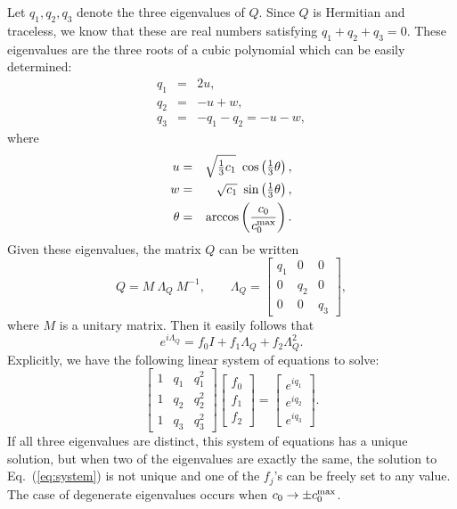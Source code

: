 Let $q_1,q_2,q_3$ denote the three eigenvalues of $Q$. Since $Q$ is
Hermitian and traceless, we know that these are real numbers satisfying
$q_1+q_2+q_3=0$.  These eigenvalues are the three roots of a cubic
polynomial which can be easily determined:
\begin{eqnarray}
q_1 &=& 2u,\\
q_2 &=& -u+w,\\
q_3 &=& -q_1-q_2=-u-w,
\end{eqnarray}
where
\begin{eqnarray}
u &=& \sqrt{\textstyle\frac{1}{3}c_1}
  \ \cos\left(\textstyle\frac{1}{3}\theta\right),\label{eq:udef}\\
w &=& \sqrt{c_1}\ \sin\left(\textstyle\frac{1}{3}\theta\right),\label{eq:wdef}\\
\theta &=& \arccos\left(\frac{c_0}{c_0^{\rm max}}\right).\label{eq:thetadef}
\end{eqnarray}
Given these eigenvalues, the matrix $Q$ can be written
\begin{equation}
 Q = M\ \Lambda_Q\ M^{-1},\qquad 
\Lambda_Q= \left[\begin{array}{ccc} q_1 &0 & 0\\ 0 & q_2 & 0\\
 0 & 0 & q_3\end{array}\right] ,
\end{equation}
where $M$ is a unitary matrix.  Then it easily follows that
\begin{equation}
  e^{i \Lambda_Q}=f_0 I + f_1\Lambda_Q + f_2\Lambda_Q^2.
\end{equation}
Explicitly, we have the following linear system of equations to solve:
\begin{equation}
 \left[\begin{array}{ccc} 1 & q_1 & q_1^2 \\
  1 & q_2 & q_2^2 \\  1 & q_3 & q_3^2 
 \end{array}\right]\left[\begin{array}{c}
  f_0\\f_1\\f_2\end{array}\right]=\left[\begin{array}{c}
 e^{i q_1}\\e^{i q_2}\\e^{i q_3}\end{array}\right].
\label{eq:system}\end{equation}
If all three eigenvalues are distinct, this system of equations
has a unique solution, but when two of the eigenvalues are exactly the
same, the solution to Eq.~(\ref{eq:system}) is not unique and one of the
$f_j$'s can be freely set to any value. The case of degenerate eigenvalues
occurs when $c_0\rightarrow \pm c_0^{\rm max}$.  

